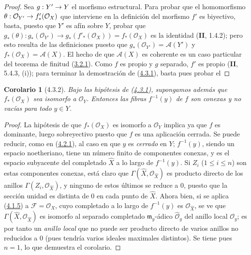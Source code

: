 \documentclass[10pt,oneside,openany]{book}
\theoremstyle{egaenv}\newtheorem*{env}{---}
\theoremstyle{egastatement}
\newtheorem*{corollary}{Corolario}
\theoremstyle{egadescription}
\renewcommand{\leq}{\leqslant}
\renewcommand{\to}{\mathchoice{\longrightarrow}{\rightarrow}{\rightarrow}{\rightarrow}}
\begin{document}
\begin{proof}
Sea $g:Y'\to Y$ el morfismo estructural. Para probar que el homomorfismo
$\theta:\mathcal O_{Y'}\to f'_*(\mathcal O_X)$ que interviene en la definición
del morfismo $f'$ es biyectivo, basta, puesto que $Y'$ es afín sobre $Y$,
probar que
$g_*(\theta):g_*(\mathcal O_{Y'})\longrightarrow
g_*(f'_*(\mathcal O_X))=f_*(\mathcal O_X)$
es la identidad (\textbf{II}, 1.4.2); pero esto resulta de las definiciones puesto que
$g_*(\mathcal O_{Y'})=\mathcal A(Y')$ y
$f_*(\mathcal O_X)=\mathcal A(X)$. El hecho de que $\mathcal A(X)$ es
coherente es un caso particular del teorema de finitud
(\hyperref[III.3.2.1-fr]{3.2.1}). Como $f$ es propio y $g$ separado,
$f'$ es propio (\textbf{II}, 5.4.3, (i)); para terminar la demostración de
(\hyperref[III.4.3.1-fr]{4.3.1}), basta pues probar el
\end{proof}

\begin{corollary}[4.3.2]
\label{III.4.3.2-fr}
Bajo las hipótesis de \textup{(\hyperref[III.4.3.1-fr]{4.3.1})}, supongamos además
que $f_*(\mathcal O_X)$ sea isomorfo a $\mathcal O_Y$. Entonces las fibras
$f^{-1}(y)$ de $f$ son conexas y no vacías para todo $y\in Y$.
\end{corollary}

\begin{proof}
La hipótesis de que $f_*(\mathcal O_X)$ es isomorfo a $\mathcal O_Y$
implica ya que $f$ es dominante, luego sobreyectivo puesto que $f$ es una
aplicación cerrada. Se puede reducir, como en
(\hyperref[III.4.2.1-fr]{4.2.1}), al caso en que $y$ es \emph{cerrado} en $Y$;
$f^{-1}(y)$, siendo un espacio noetheriano, tiene un número finito de componentes
conexas, y es el espacio subyacente del completado $\widehat X$ a lo largo de
$f^{-1}(y)$. Si $Z_i$ ($1\leq i\leq n$) son estas componentes conexas, está
claro que $\Gamma(\widehat X,\mathcal O_{\widehat X})$ es producto
directo de los anillos $\Gamma(Z_i,\mathcal O_{\widehat X})$, y ninguno de estos
últimos se reduce a $0$, puesto que la sección unidad es distinta de
$0$ en cada punto de $\widehat X$. Ahora bien, si se aplica
(\hyperref[III.4.1.5-fr]{4.1.5}) a $\mathcal F=\mathcal O_X$, cuyo
completado a lo largo de $f^{-1}(y)$ es $\mathcal O_{\widehat X}$, se ve que
$\Gamma(\widehat X,\mathcal O_{\widehat X})$ es isomorfo al separado
completado $\mathfrak m_y$-ádico $\widehat{\mathcal O}_y$ del anillo local
$\mathcal O_y$; es por tanto un \emph{anillo local} que no puede ser producto
directo de varios anillos no reducidos a $0$ (pues tendría
varios ideales maximales distintos). Se tiene pues $n=1$, lo que demuestra el
corolario.
\end{proof}
\end{document}
